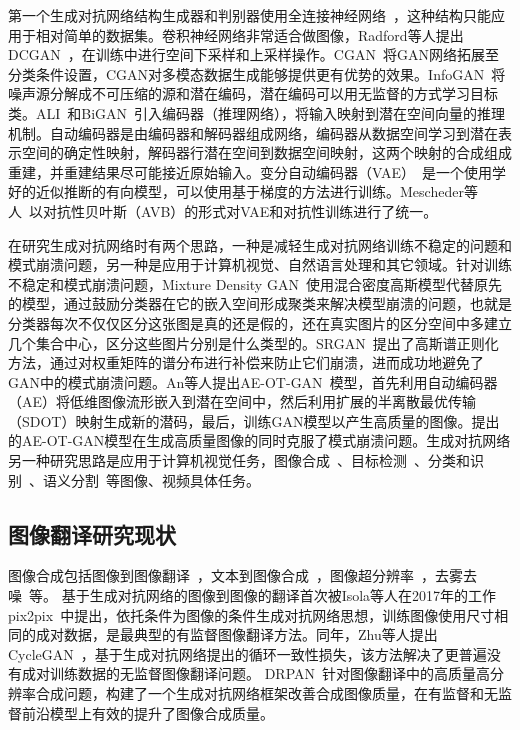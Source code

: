 第一个生成对抗网络结构生成器和判别器使用全连接神经网络~\cite{goodfellow2014generative}，这种结构只能应用于相对简单的数据集。卷积神经网络非常适合做图像，Radford等人提出DCGAN~\cite{radford2015unsupervised}，在训练中进行空间下采样和上采样操作。CGAN~\cite{mirza2014conditional}将GAN网络拓展至分类条件设置，CGAN对多模态数据生成能够提供更有优势的效果。InfoGAN~\cite{chen2016infogan}将噪声源分解成不可压缩的源和潜在编码，潜在编码可以用无监督的方式学习目标类。ALI~\cite{donahue2016adversarial}和BiGAN~\cite{zhang2018bidirectional}引入编码器（推理网络），将输入映射到潜在空间向量的推理机制。自动编码器是由编码器和解码器组成网络，编码器从数据空间学习到潜在表示空间的确定性映射，解码器行潜在空间到数据空间映射，这两个映射的合成组成重建，并重建结果尽可能接近原始输入。变分自动编码器（VAE）~\cite{kingma2013auto}是一个使用学好的近似推断的有向模型，可以使用基于梯度的方法进行训练。Mescheder等人~\cite{mescheder2017adversarial}以对抗性贝叶斯（AVB）的形式对VAE和对抗性训练进行了统一。

在研究生成对抗网络时有两个思路，一种是减轻生成对抗网络训练不稳定的问题和模式崩溃问题，另一种是应用于计算机视觉、自然语言处理和其它领域。针对训练不稳定和模式崩溃问题，Mixture Density GAN~\cite{eghbal2019mixture}使用混合密度高斯模型代替原先的模型，通过鼓励分类器在它的嵌入空间形成聚类来解决模型崩溃的问题，也就是分类器每次不仅仅区分这张图是真的还是假的，还在真实图片的区分空间中多建立几个集合中心，区分这些图片分别是什么类型的。SRGAN~\cite{liu2019spectral}提出了高斯谱正则化方法，通过对权重矩阵的谱分布进行补偿来防止它们崩溃，进而成功地避免了GAN中的模式崩溃问题。An等人提出AE-OT-GAN~\cite{an2020ae}模型，首先利用自动编码器（AE）将低维图像流形嵌入到潜在空间中，然后利用扩展的半离散最优传输（SDOT）映射生成新的潜码，最后，训练GAN模型以产生高质量的图像。提出的AE-OT-GAN模型在生成高质量图像的同时克服了模式崩溃问题。生成对抗网络另一种研究思路是应用于计算机视觉任务，图像合成~\cite{wang2019discriminative}、目标检测~\cite{wang2017fast}、分类和识别~\cite{oza2020multiple,fang2020generate,jung2020icaps}、语义分割~\cite{luc2016semantic}等图像、视频具体任务。

\subsection{图像翻译研究现状}

图像合成包括图像到图像翻译~\cite{isola2017image}，文本到图像合成~\cite{zhu2019dm}，图像超分辨率~\cite{hyun2020varsr,lee2020journey}，去雾去噪~\cite{shao2020domain,wan2020reflection}等。
基于生成对抗网络的图像到图像的翻译首次被Isola等人在2017年的工作pix2pix~\cite{isola2017image}中提出，依托条件为图像的条件生成对抗网络思想，训练图像使用尺寸相同的成对数据，是最典型的有监督图像翻译方法。同年，Zhu等人提出CycleGAN~\cite{zhu2017unpaired}，基于生成对抗网络提出的循环一致性损失，该方法解决了更普遍没有成对训练数据的无监督图像翻译问题。
DRPAN~\cite{wang2019discriminative}针对图像翻译中的高质量高分辨率合成问题，构建了一个生成对抗网络框架改善合成图像质量，在有监督和无监督前沿模型上有效的提升了图像合成质量。

